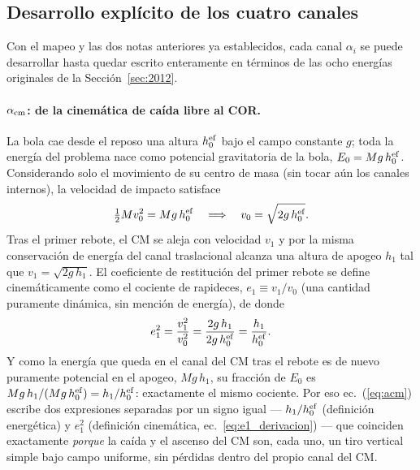\documentclass[11pt,a4paper]{article}
\begin{document}
\subsection{Desarrollo explícito de los cuatro canales}
\label{sec:desarrollo_canales}

Con el mapeo y las dos notas anteriores ya establecidos, cada canal
$\alpha_i$ se puede desarrollar hasta quedar escrito enteramente en
términos de las ocho energías originales de la Sección~\ref{sec:2012}.

\paragraph{$\alpha_{\rm cm}$: de la cinemática de caída libre al COR.}
La bola cae desde el reposo una altura $h_0^{\rm ef}$ bajo el campo
constante $g$; toda la energía del problema nace como potencial
gravitatoria de la bola, $E_0=Mg\,h_0^{\rm ef}$. Considerando solo el
movimiento de su centro de masa (sin tocar aún los canales internos), la
velocidad de impacto satisface
\[
\tfrac12 M v_0^2 = Mg\,h_0^{\rm ef} \quad\Longrightarrow\quad
v_0=\sqrt{2g\,h_0^{\rm ef}}.
\]
Tras el primer rebote, el CM se aleja con velocidad $v_1$ y por la misma
conservación de energía del canal traslacional alcanza una altura de
apogeo $h_1$ tal que $v_1=\sqrt{2g\,h_1}$. El coeficiente de restitución
del primer rebote se define cinemáticamente como el cociente de
rapideces, $e_1\equiv v_1/v_0$ (una cantidad puramente dinámica, sin
mención de energía), de donde
\begin{equation}
e_1^2=\frac{v_1^2}{v_0^2}=\frac{2g\,h_1}{2g\,h_0^{\rm ef}}
=\frac{h_1}{h_0^{\rm ef}}.
\label{eq:e1_derivacion}
\end{equation}
Y como la energía que queda en el canal del CM tras el rebote es de nuevo
puramente potencial en el apogeo, $Mg\,h_1$, su fracción de $E_0$ es
$Mg\,h_1/(Mg\,h_0^{\rm ef})=h_1/h_0^{\rm ef}$: exactamente el mismo
cociente. Por eso ec.~(\ref{eq:acm}) escribe dos expresiones separadas por
un signo igual --- $h_1/h_0^{\rm ef}$ (definición energética) y $e_1^2$
(definición cinemática, ec.~\ref{eq:e1_derivacion}) --- que coinciden
exactamente \emph{porque} la caída y el ascenso del CM son, cada uno, un
tiro vertical simple bajo campo uniforme, sin pérdidas dentro del propio
canal del CM.
\end{document}
